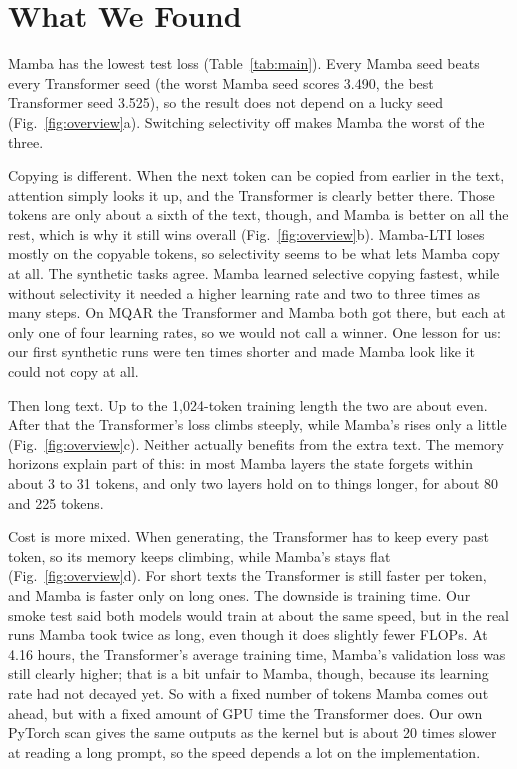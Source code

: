 \documentclass[conference]{IEEEtran}
\begin{document}
\section{What We Found}
Mamba has the lowest test loss (Table~\ref{tab:main}). Every Mamba seed beats every Transformer seed (the
worst Mamba seed scores 3.490, the best Transformer seed 3.525), so the result does not depend on a lucky
seed (Fig.~\ref{fig:overview}a). Switching selectivity off
makes Mamba the worst of the three.

Copying is different. When the next token can be copied from earlier in the text, attention simply looks
it up, and the Transformer is clearly better there. Those tokens are only about a sixth of the text,
though, and Mamba is better on all the rest, which is why it still wins overall (Fig.~\ref{fig:overview}b).
Mamba-LTI loses mostly on the copyable tokens, so selectivity seems to be what lets Mamba copy at all. The
synthetic tasks agree. Mamba learned selective copying fastest, while without selectivity it needed a
higher learning rate and two to three times as many steps. On MQAR the Transformer and Mamba both got
there, but each at only one of four learning rates, so we would not call a winner. One lesson for us: our
first synthetic runs were ten times shorter and made Mamba look like it could not copy at all.

Then long text. Up to the 1,024-token training length the two are about even. After that the Transformer's loss climbs steeply, while Mamba's rises only a little
(Fig.~\ref{fig:overview}c). Neither actually benefits from the extra text. The memory horizons explain part
of this: in most Mamba layers the state forgets within about 3 to 31 tokens, and only two layers hold on to
things longer, for about 80 and 225 tokens.

Cost is more mixed. When generating, the Transformer has to keep every past token, so its memory keeps
climbing, while Mamba's stays flat (Fig.~\ref{fig:overview}d). For short texts the Transformer is still
faster per token, and Mamba is faster only on long ones. The downside is training time. Our smoke test
said both models would train at about the same speed, but in the real runs Mamba took twice as long, even
though it does slightly fewer FLOPs. At 4.16 hours, the Transformer's average training time, Mamba's validation loss was still
clearly higher; that is a bit unfair to Mamba, though, because its learning rate had not decayed yet. So
with a fixed number of tokens Mamba comes out ahead, but with a fixed amount of GPU time the Transformer
does. Our own PyTorch scan gives the same outputs as the kernel but is about 20 times slower at reading a
long prompt, so the speed depends a lot on the implementation.
\end{document}
